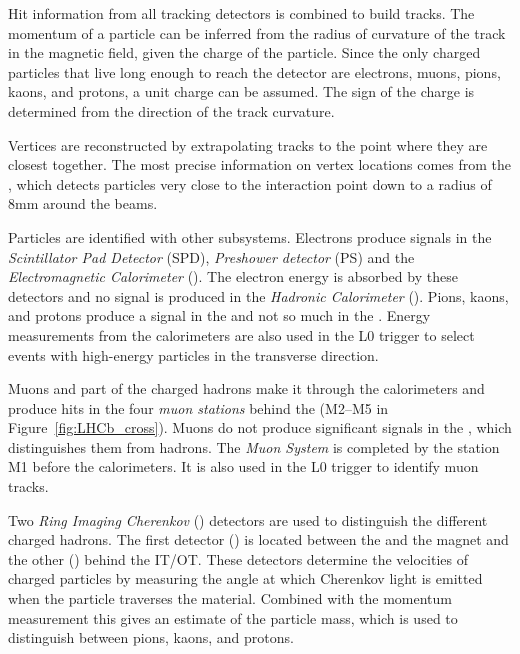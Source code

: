 Hit information from all tracking detectors is combined to build tracks. The momentum of a particle can be inferred from the radius of
curvature of the track in the magnetic field, given the charge of the particle. Since the only charged particles that live long enough to
reach the detector are electrons, muons, pions, kaons, and protons, a unit charge can be assumed. The sign of the charge is determined from
the direction of the track curvature.

Vertices are reconstructed by extrapolating tracks to the point where they are closest together. The most precise information on vertex
locations comes from the \velo, which detects particles very close to the interaction point down to a radius of 8\unitsp{}mm
around the beams.

Particles are identified with other subsystems. Electrons produce signals in the \emph{Scintillator Pad Detector} (SPD), \emph{Preshower
detector} (PS) and the \emph{Electromagnetic Calorimeter} (\ecal). The electron energy is absorbed by these detectors and no signal is
produced in the \emph{Hadronic Calorimeter} (\hcal). Pions, kaons, and protons produce a signal in the \hcal{} and not so much in the
\ecal. Energy measurements from the calorimeters are also used in the L0 trigger to select events with high-energy particles in the
transverse direction.

Muons and part of the charged hadrons make it through the calorimeters and produce hits in the four \emph{muon stations} behind the \hcal{}
(M2--M5 in Figure~\ref{fig:LHCb_cross}). Muons do not produce significant signals in the \hcal, which distinguishes them from hadrons. The
\emph{Muon System} is completed by the station M1 before the calorimeters. It is also used in the L0 trigger to identify muon tracks.

Two \emph{Ring Imaging Cherenkov} (\rich) detectors are used to distinguish the different charged hadrons. The first \rich{} detector
() is located between the \velo{} and the magnet and the other () behind the IT/OT. These detectors determine the velocities of
charged particles by measuring the angle at which Cherenkov light is emitted when the particle traverses the \rich{} material. Combined
with the momentum measurement this gives an estimate of the particle mass, which is used to distinguish between pions, kaons, and protons.

